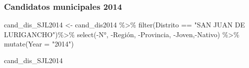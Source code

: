 \documentclass[
]{book}
\newenvironment{Shaded}{\begin{snugshade}}{\end{snugshade}}
\newcommand{\AttributeTok}[1]{\textcolor[rgb]{0.77,0.63,0.00}{#1}}
\newcommand{\FunctionTok}[1]{\textcolor[rgb]{0.00,0.00,0.00}{#1}}
\newcommand{\NormalTok}[1]{#1}
\newcommand{\OtherTok}[1]{\textcolor[rgb]{0.56,0.35,0.01}{#1}}
\newcommand{\SpecialCharTok}[1]{\textcolor[rgb]{0.00,0.00,0.00}{#1}}
\newcommand{\StringTok}[1]{\textcolor[rgb]{0.31,0.60,0.02}{#1}}
\begin{document}
\hypertarget{candidatos-municipales-2014}{%
\subsubsection{Candidatos municipales 2014}\label{candidatos-municipales-2014}}

\begin{Shaded}
\begin{Highlighting}[]
\NormalTok{cand\_dis\_SJL2014 }\OtherTok{\textless{}{-}}\NormalTok{ cand\_dis2014 }\SpecialCharTok{\%\textgreater{}\%}
  \FunctionTok{filter}\NormalTok{(Distrito }\SpecialCharTok{==} \StringTok{"SAN JUAN DE LURIGANCHO"}\NormalTok{)}\SpecialCharTok{\%\textgreater{}\%}
  \FunctionTok{select}\NormalTok{(}\SpecialCharTok{{-}}\StringTok{\textasciigrave{}}\AttributeTok{N°}\StringTok{\textasciigrave{}}\NormalTok{, }\SpecialCharTok{{-}}\StringTok{\textasciigrave{}}\AttributeTok{Región}\StringTok{\textasciigrave{}}\NormalTok{, }\SpecialCharTok{{-}}\StringTok{\textasciigrave{}}\AttributeTok{Provincia}\StringTok{\textasciigrave{}}\NormalTok{, }\SpecialCharTok{{-}}\StringTok{\textasciigrave{}}\AttributeTok{Joven}\StringTok{\textasciigrave{}}\NormalTok{,}\SpecialCharTok{{-}}\StringTok{\textasciigrave{}}\AttributeTok{Nativo}\StringTok{\textasciigrave{}}\NormalTok{) }\SpecialCharTok{\%\textgreater{}\%} 
  \FunctionTok{mutate}\NormalTok{(}\AttributeTok{Year =} \StringTok{"2014"}\NormalTok{)}
\end{Highlighting}
\end{Shaded}

\begin{Shaded}
\begin{Highlighting}[]
\NormalTok{cand\_dis\_SJL2014}
\end{Highlighting}
\end{Shaded}
\end{document}
